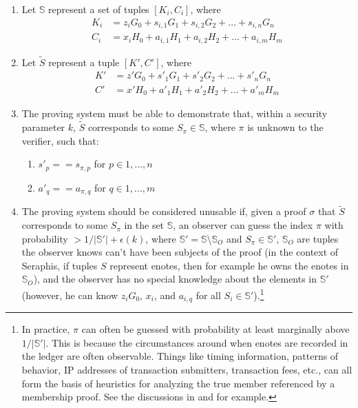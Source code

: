 \begin{enumerate}
    \item Let $\mathbb{S}$ represent a set of tuples $[K_i, C_i]$, where\vspace{.115cm}
    \begin{align*}
        K_i &= z_i G_0 + s_{i,1} G_1 + s_{i,2} G_2 + ... + s_{i,n} G_n \\
        C_i &= x_i H_0 + a_{i,1} H_1 + a_{i,2} H_2 + ... + a_{i,m} H_m
    \end{align*}

    \item Let $\tilde{S}$ represent a tuple $[K', C']$, where\vspace{.115cm}
    \begin{align*}
        K' &= z' G_0 + s'_1 G_1 + s'_2 G_2 + ... + s'_n G_n \\
        C' &= x' H_0 + a'_1 H_1 + a'_2 H_2 + ... + a'_m H_m
    \end{align*}

    \item The proving system must be able to demonstrate that, within a security parameter $k$, $\tilde{S}$ corresponds to some $S_{\pi} \in \mathbb{S}$, where $\pi$ is unknown to the verifier, such that:
    \begin{enumerate}
        \item $s'_p == s_{\pi,p}$ for $p \in 1,...,n$
        \item $a'_q == a_{\pi,q}$ for $q \in 1,...,m$
    \end{enumerate}

    \item The proving system should be considered unusable if, given a proof $\sigma$ that $\tilde{S}$ corresponds to some $S_{\pi}$ in the set $\mathbb{S}$, an observer can guess the index $\pi$ with probability $> 1/|\mathbb{S}'| + \epsilon(k)$, where $\mathbb{S}' = \mathbb{S}$\textbackslash$\mathbb{S}_O$ and $S_{\pi} \in \mathbb{S}'$, $\mathbb{S}_O$ are tuples the observer knows can't have been subjects of the proof (in the context of Seraphis, if tuples $S$ represent enotes, then for example he owns the enotes in $\mathbb{S}_O$), and the observer has no special knowledge about the elements in $\mathbb{S}'$ (however, he can know $z_i G_0$, $x_i$, and $a_{i,q}$ for all $S_i \in \mathbb{S}'$).\footnote{In practice, $\pi$ can often be guessed with probability at least marginally above $1/|\mathbb{S}'|$. This is because the circumstances around when enotes are recorded in the ledger are often observable. Things like timing information, patterns of behavior, IP addresses of transaction submitters, transaction fees, etc., can all form the basis of heuristics for analyzing the true member referenced by a membership proof. See the discussions in \cite{AnalysisOfLinkability} and \cite{foundations-ring-sampling} for example.}
\end{enumerate}

